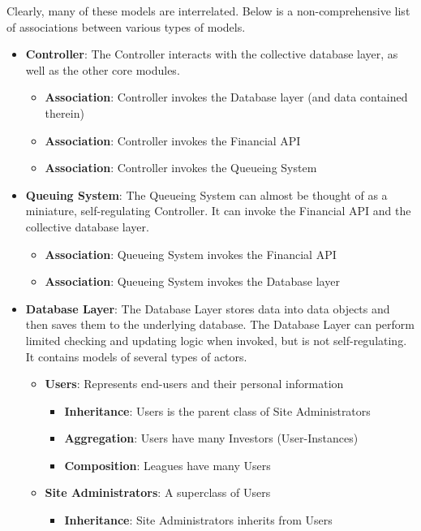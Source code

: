 Clearly, many of these models are interrelated. Below is a non-comprehensive
list of associations between various types of models.

\begin{itemize}
\item \textbf{Controller}: The Controller interacts with the collective database layer, 
as well as the other core modules.
	\begin{itemize}
	\item \textbf{Association}: Controller invokes the Database layer (and data contained therein)
	\item \textbf{Association}: Controller invokes the Financial API 
	\item \textbf{Association}: Controller invokes the Queueing System
	\end{itemize}
\item \textbf{Queuing System}: The Queueing System can almost be thought of as a 
miniature, self-regulating Controller. It can invoke the Financial API and the 
collective database layer.
	\begin{itemize}
	\item \textbf{Association}: Queueing System invokes the Financial API
	\item \textbf{Association}: Queueing System invokes the Database layer
	\end{itemize}
\item \textbf{Database Layer}: The Database Layer stores data into data objects and then
saves them to the underlying database. The Database Layer can perform limited checking
and updating logic when invoked, but is not self-regulating. It contains models of
several types of actors.
	\begin{itemize}
	\item \textbf{Users}: Represents end-users and their personal information
		\begin{itemize}
		\item \textbf{Inheritance}: Users is the parent class of Site Administrators
		\item \textbf{Aggregation}: Users have many Investors (User-Instances)
		\item \textbf{Composition}: Leagues have many Users
		\end{itemize}
	\item \textbf{Site Administrators}: A superclass of Users
		\begin{itemize}
		\item \textbf{Inheritance}: Site Administrators inherits from Users

\end{itemize}
\end{itemize}
\end{itemize}
